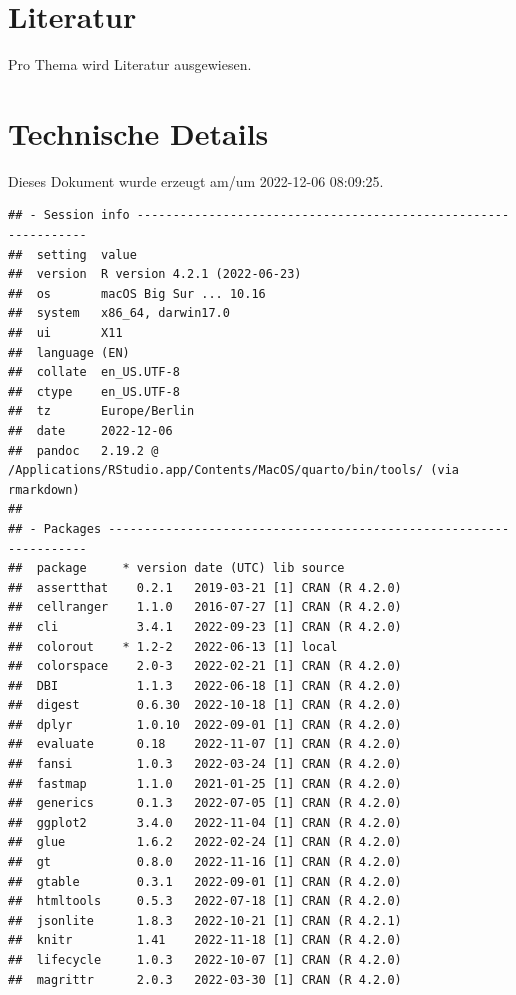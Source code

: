 \documentclass[
  a4paper,
  DIV=11]{scrreprt}
\theoremstyle{definition}
\theoremstyle{remark}
\begin{document}
\hypertarget{literatur}{%
\section*{Literatur}\label{literatur}}

Pro Thema wird Literatur ausgewiesen.

\hypertarget{technische-details}{%
\section*{Technische Details}\label{technische-details}}

Dieses Dokument wurde erzeugt am/um 2022-12-06 08:09:25.

\begin{verbatim}
## - Session info ---------------------------------------------------------------
##  setting  value
##  version  R version 4.2.1 (2022-06-23)
##  os       macOS Big Sur ... 10.16
##  system   x86_64, darwin17.0
##  ui       X11
##  language (EN)
##  collate  en_US.UTF-8
##  ctype    en_US.UTF-8
##  tz       Europe/Berlin
##  date     2022-12-06
##  pandoc   2.19.2 @ /Applications/RStudio.app/Contents/MacOS/quarto/bin/tools/ (via rmarkdown)
## 
## - Packages -------------------------------------------------------------------
##  package     * version date (UTC) lib source
##  assertthat    0.2.1   2019-03-21 [1] CRAN (R 4.2.0)
##  cellranger    1.1.0   2016-07-27 [1] CRAN (R 4.2.0)
##  cli           3.4.1   2022-09-23 [1] CRAN (R 4.2.0)
##  colorout    * 1.2-2   2022-06-13 [1] local
##  colorspace    2.0-3   2022-02-21 [1] CRAN (R 4.2.0)
##  DBI           1.1.3   2022-06-18 [1] CRAN (R 4.2.0)
##  digest        0.6.30  2022-10-18 [1] CRAN (R 4.2.0)
##  dplyr         1.0.10  2022-09-01 [1] CRAN (R 4.2.0)
##  evaluate      0.18    2022-11-07 [1] CRAN (R 4.2.0)
##  fansi         1.0.3   2022-03-24 [1] CRAN (R 4.2.0)
##  fastmap       1.1.0   2021-01-25 [1] CRAN (R 4.2.0)
##  generics      0.1.3   2022-07-05 [1] CRAN (R 4.2.0)
##  ggplot2       3.4.0   2022-11-04 [1] CRAN (R 4.2.0)
##  glue          1.6.2   2022-02-24 [1] CRAN (R 4.2.0)
##  gt            0.8.0   2022-11-16 [1] CRAN (R 4.2.0)
##  gtable        0.3.1   2022-09-01 [1] CRAN (R 4.2.0)
##  htmltools     0.5.3   2022-07-18 [1] CRAN (R 4.2.0)
##  jsonlite      1.8.3   2022-10-21 [1] CRAN (R 4.2.1)
##  knitr         1.41    2022-11-18 [1] CRAN (R 4.2.0)
##  lifecycle     1.0.3   2022-10-07 [1] CRAN (R 4.2.0)
##  magrittr      2.0.3   2022-03-30 [1] CRAN (R 4.2.0)

\end{verbatim}
\end{document}
